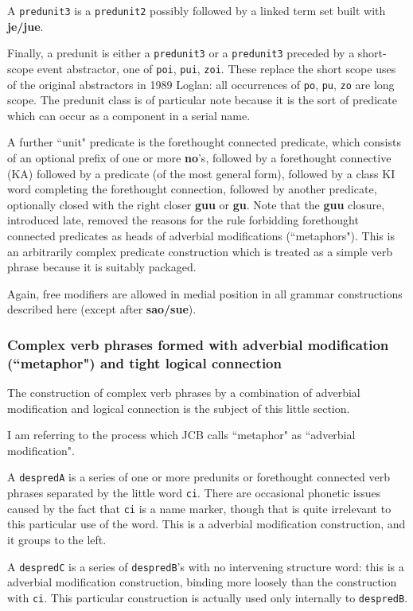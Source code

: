 \documentclass[12pt]{book}
\begin{document}
{A {\tt predunit3} is a {\tt predunit2} possibly followed by a linked term set built with {\bf je/jue}.

Finally, a predunit is either a {\tt predunit3} or a {\tt predunit3} preceded by a short-scope event abstractor, one of {\tt poi}, {\tt pui}, {\tt zoi}.
These replace the short scope uses of the original abstractors in 1989 Loglan:  all occurrences of {\tt po}, {\tt pu}, {\tt zo} are long scope.  The predunit class is of particular note because it is the sort of predicate which can occur as a component in a serial name.

A further ``unit" predicate is the forethought connected predicate, which consists of an optional prefix of one or more {\bf no}'s, followed
by a forethought connective (KA) followed by a predicate (of the most general form), followed by a class KI word completing the forethought connection, followed by another predicate, optionally closed with the right closer {\bf guu} or {\bf gu}.  Note that the {\bf guu} closure, introduced late, removed the reasons for the rule forbidding forethought connected predicates as heads of adverbial modifications (``metaphors").  This is an arbitrarily complex predicate construction which is treated as a simple verb phrase because it is suitably packaged.

Again, free modifiers are allowed in medial position in all grammar constructions described here (except after {\bf sao/sue}).

\subsubsection{Complex verb phrases formed with adverbial modification (``metaphor") and tight logical connection}

The construction of complex verb phrases by a combination of adverbial modification and logical connection is the subject of this little section.

I am referring to the process which JCB calls ``metaphor" as ``adverbial modification".

A {\tt despredA} is a series of one or more predunits or forethought connected verb phrases separated by the little word {\tt ci}.  There are occasional phonetic issues caused by the fact that {\tt ci} is a name marker, though that is quite irrelevant to this particular use of the word.  This is a adverbial modification construction, and it groups to the left.

A {\tt despredC} is a series of {\tt despredB}'s with no intervening structure word:  this is a adverbial modification construction, binding more loosely
than the construction with {\tt ci}.  This particular construction is actually used only internally to {\tt despredB}.

}
\end{document}
